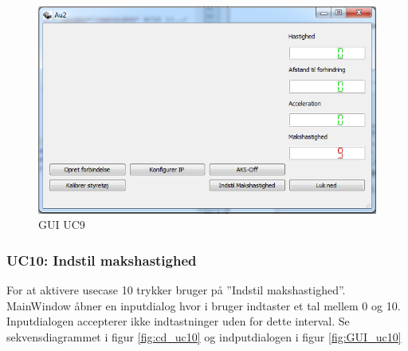 \begin{figure}[H]
\centering
\includegraphics[width=\textwidth* 3/4,height=\textwidth* 9/20 ]{../fig/billeder/gui_uc9.png}
\caption{GUI UC9}
\label{fig:GUI_uc9}
\end{figure}

\subsubsection{UC10: Indstil makshastighed}
For at aktivere usecase 10 trykker bruger på ''Indstil makshastighed''.
MainWindow åbner en inputdialog hvor i bruger indtaster et tal mellem 0 og 10. Inputdialogen accepterer ikke indtastninger uden for dette interval. Se sekvensdiagrammet i figur \ref{fig:cd_uc10} og indputdialogen i figur \ref{fig:GUI_uc10}

